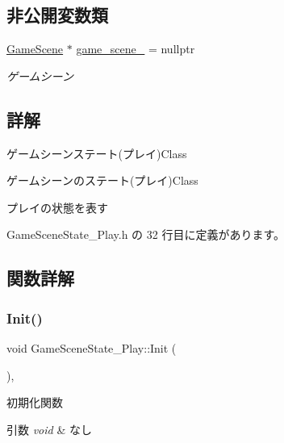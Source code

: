 \subsection*{非公開変数類}
\begin{DoxyCompactItemize}
\item 
\mbox{\hyperlink{class_game_scene}{Game\+Scene}} $\ast$ \mbox{\hyperlink{class_game_scene_state___play_aec1f62101eefe333d4da5a2a30ef21d2}{game\+\_\+scene\+\_\+}} = nullptr
\begin{DoxyCompactList}\small\item\em ゲームシーン \end{DoxyCompactList}\end{DoxyCompactItemize}


\subsection{詳解}
ゲームシーンステート(プレイ)Class 

ゲームシーンのステート(プレイ)Class

プレイの状態を表す 

 Game\+Scene\+State\+\_\+\+Play.\+h の 32 行目に定義があります。



\subsection{関数詳解}
\mbox{\label{class_game_scene_state___play_a2637c407c8bbe0ef76b472c5b63e8057}} 
\subsubsection{\texorpdfstring{Init()}{Init()}}
{\footnotesize\ttfamily void Game\+Scene\+State\+\_\+\+Play\+::\+Init (\begin{DoxyParamCaption}{ }\end{DoxyParamCaption})\hspace{0.3cm}{\ttfamily [override]}, {\ttfamily [virtual]}}



初期化関数 


\begin{DoxyParams}{引数}
{\em void} & なし \\
\hline
\end{DoxyParams}

